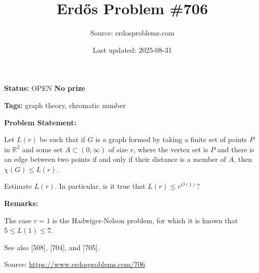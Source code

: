 \documentclass{article}
\title{Erd\H{o}s Problem \#706}
\date{Last updated: 2025-08-31}
\author{Source: erdosproblems.com}
\begin{document}
\maketitle

\noindent\textbf{Status:} OPEN \quad \textbf{No prize}

\noindent\textbf{Tags:} graph theory, chromatic number

\medskip
\noindent\textbf{Problem Statement:}

Let $L(r)$ be such that if $G$ is a graph formed by taking a finite set of points $P$ in $\mathbb{R}^2$ and some set $A\subset (0,\infty)$ of size $r$, where the vertex set is $P$ and there is an edge between two points if and only if their distance is a member of $A$, then $\chi(G)\leq L(r)$.

Estimate $L(r)$. In particular, is it true that $L(r)\leq r^{O(1)}$?

\bigskip
\noindent\textbf{Remarks:}

The case $r=1$ is the Hadwiger-Nelson problem, for which it is known that $5\leq L(1)\leq 7$.

See also [508], [704], and [705].

\bigskip
\noindent\small{Source: \url{https://www.erdosproblems.com/706}}
\end{document}
